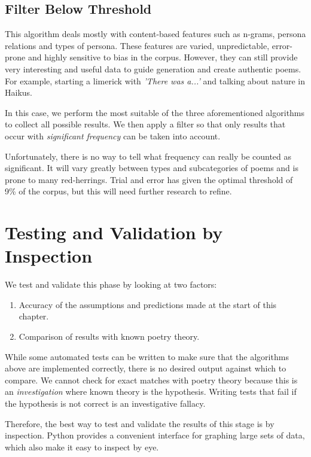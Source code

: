 \subsection{Filter Below Threshold}

This algorithm deals mostly with content-based features such as n-grams, persona relations and types of persona. These features are varied, unpredictable, error-prone and highly sensitive to bias in the corpus. However, they can still provide very interesting and useful data to guide generation and create authentic poems. For example, starting a limerick with \textit{'There was a...'} and talking about nature in Haikus.

In this case, we perform the most suitable of the three aforementioned algorithms to collect all possible results. We then apply a filter so that only results that occur with \textit{significant frequency} can be taken into account.

Unfortunately, there is no way to tell what frequency can really be counted as significant. It will vary greatly between types and subcategories of poems and is prone to many red-herrings. Trial and error has given the optimal threshold of 9\% of the corpus, but this will need further research to refine.

\section{Testing and Validation by Inspection}

We test and validate this phase by looking at two factors:
\begin{enumerate}
\item{Accuracy of the assumptions and predictions made at the start of this chapter.}
\item{Comparison of results with known poetry theory.}
\end{enumerate}

While some automated tests can be written to make sure that the algorithms above are implemented correctly, there is no desired output against which to compare. We cannot check for exact matches with poetry theory because this is an \textit{investigation} where known theory is the hypothesis. Writing tests that fail if the hypothesis is not correct is an investigative fallacy.

Therefore, the best way to test and validate the results of this stage is by inspection. Python provides a convenient interface for graphing large sets of data, which also make it easy to inspect by eye. 

